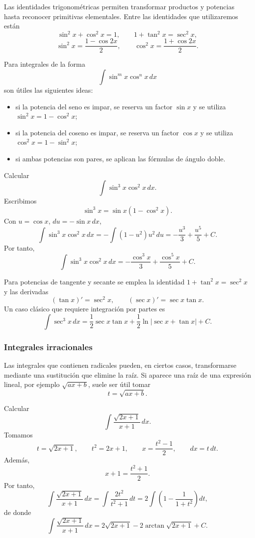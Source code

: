 Las identidades trigonométricas permiten transformar productos y potencias hasta reconocer primitivas elementales. Entre las identidades que utilizaremos están
\[
\sin^2x+\cos^2x=1,
\qquad
1+\tan^2x=\sec^2x,
\]
\[
\sin^2x=\frac{1-\cos2x}{2},
\qquad
\cos^2x=\frac{1+\cos2x}{2}.
\]

Para integrales de la forma
\[
\int\sin^m x\cos^n x\,dx
\]
son útiles las siguientes ideas:

\begin{itemize}
\item si la potencia del seno es impar, se reserva un factor $\sin x$ y se utiliza $\sin^2x=1-\cos^2x$;
\item si la potencia del coseno es impar, se reserva un factor $\cos x$ y se utiliza $\cos^2x=1-\sin^2x$;
\item si ambas potencias son pares, se aplican las fórmulas de ángulo doble.
\end{itemize}

\begin{example}
Calcular
\[
\int\sin^3x\cos^2x\,dx.
\]
Escribimos
\[
\sin^3x=\sin x(1-\cos^2x).
\]
Con $u=\cos x$, $du=-\sin x\,dx$,
\[
\int\sin^3x\cos^2x\,dx
=-\int(1-u^2)u^2\,du
=-\frac{u^3}{3}+\frac{u^5}{5}+C.
\]
Por tanto,
\[
\boxed{\int\sin^3x\cos^2x\,dx
=-\frac{\cos^3x}{3}+\frac{\cos^5x}{5}+C.}
\]
\end{example}

Para potencias de tangente y secante se emplea la identidad $1+\tan^2x=\sec^2x$ y las derivadas
\[
(\tan x)'=\sec^2x,
\qquad
(\sec x)'=\sec x\tan x.
\]
Un caso clásico que requiere integración por partes es
\[
\int\sec^3x\,dx
=
\frac12\sec x\tan x+\frac12\ln|\sec x+\tan x|+C.
\]

\subsubsection{Integrales irracionales}

Las integrales que contienen radicales pueden, en ciertos casos, transformarse mediante una sustitución que elimine la raíz. Si aparece una raíz de una expresión lineal, por ejemplo $\sqrt{ax+b}$, suele ser útil tomar
\[
t=\sqrt{ax+b}.
\]

\begin{example}
Calcular
\[
\int\frac{\sqrt{2x+1}}{x+1}\,dx.
\]
Tomamos
\[
t=\sqrt{2x+1},
\qquad t^2=2x+1,
\qquad x=\frac{t^2-1}{2},
\qquad dx=t\,dt.
\]
Además,
\[
x+1=\frac{t^2+1}{2}.
\]
Por tanto,
\[
\int\frac{\sqrt{2x+1}}{x+1}\,dx
=
\int\frac{2t^2}{t^2+1}\,dt
=
2\int\left(1-\frac1{1+t^2}\right)dt,
\]
de donde
\[
\boxed{\int\frac{\sqrt{2x+1}}{x+1}\,dx
=2\sqrt{2x+1}-2\arctan\!\sqrt{2x+1}+C.}
\]
\end{example}

